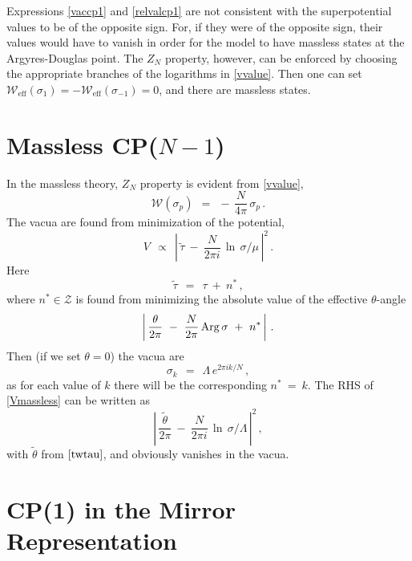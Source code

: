 \documentclass[12pt]{article}
\def\beq{\begin{equation}}
\def\eeq{\end{equation}}
\newcommand{\wt}{\widetilde}
\newcommand{\mc}[1]{\mathcal{#1}}
\begin{document}
	Expressions \eqref{vaccp1} and \eqref{relvalcp1} are not consistent with the superpotential values to be of the opposite sign.
	For, if they were of the opposite sign, their values would have to vanish in order for the model to have
	massless states at the Argyres-Douglas point. 
	The $ Z_N $ property, however, can be enforced by choosing the appropriate branches of the logarithms in
	\eqref{vvalue}. 
	Then one can set $ \mc{W}_\text{eff}(\sigma_1) = - \mc{W}_\text{eff}(\sigma_{-1}) = 0 $, and there are massless states.

\section*{Massless CP({\boldmath $N-1$})}

	In the massless theory, $Z_N$ property is evident from \eqref{vvalue},
\beq
	\mc{W}(\sigma_p) ~~=~~ -\, \frac{N}{4\pi}\, \sigma_p \,.
\eeq
	The vacua are found from minimization of the potential,
\beq
\label{Vmassless}
	V ~~\propto~~ \left|\, \wt{\tau} ~-~ \frac{N}{2\pi i}\, \ln\, \sigma/\mu \,\right|^2\,.
\eeq
	Here 
\beq
\label{twtau}
	\wt{\tau} ~~=~~ \tau ~+~ n^*\,,
\eeq	
	where $ n^* \in {\mc Z} $ is found from minimizing the absolute value of the effective $\theta$-angle
\beq	
	\left|\, \frac{\theta}{2\pi} ~-~ \frac{N}{2\pi}\, {\rm Arg}\, \sigma ~+~ n^* \,\right| \,.
\eeq
	Then (if we set $\theta = 0$) the vacua are
\beq
	\sigma_k ~~=~~ \Lambda\, e^{2\pi i k / N}\,,
\eeq
	as for each value of $k$ there will be the corresponding $ n^* ~=~ k $.
	The RHS of \eqref{Vmassless} can be written as
\beq
	\left|\, \frac{\wt{\theta}}{2\pi} ~-~ \frac{N}{2\pi i}\, \ln\, \sigma/\Lambda   \,\right|^2 \,,
\eeq
	with $ \wt{\theta} $ from $ \eqref{twtau} $, and obviously vanishes in the vacua.

\section*{CP(1) in the Mirror Representation}
\end{document}
